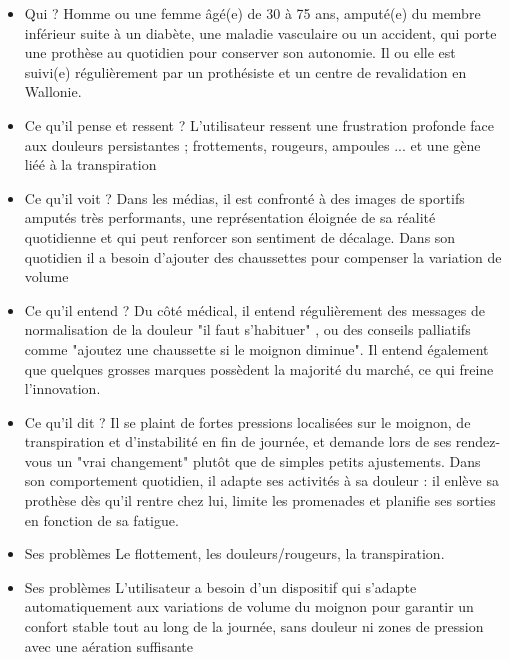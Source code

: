 \begin{itemize}
    \item Qui ? Homme ou une femme âgé(e) de 30 à 75 ans, amputé(e) du membre inférieur suite à un diabète, une maladie vasculaire ou un accident, qui porte une prothèse au quotidien pour conserver son autonomie. Il ou elle est suivi(e) régulièrement par un prothésiste et un centre de revalidation en Wallonie.

    \item Ce qu'il pense et ressent ? L'utilisateur ressent une frustration profonde face aux douleurs persistantes ; frottements, rougeurs, ampoules ... et une gène liéé à la transpiration 

    \item Ce qu'il voit ?  Dans les médias, il est confronté à des images de sportifs amputés très performants, une représentation éloignée de sa réalité quotidienne et qui peut renforcer son sentiment de décalage. Dans son quotidien il a besoin d'ajouter des chaussettes pour compenser la variation de volume

    \item Ce qu'il entend ? Du côté médical, il entend régulièrement des messages de normalisation de la douleur "il faut s'habituer" , ou des conseils palliatifs comme "ajoutez une chaussette si le moignon diminue". Il entend également que quelques grosses marques possèdent la majorité du marché, ce qui freine l'innovation.

    \item Ce qu'il dit ?
    Il se plaint de fortes pressions localisées sur le moignon, de transpiration et d'instabilité en fin de journée, et demande lors de ses rendez-vous un "vrai changement" plutôt que de simples petits ajustements. Dans son comportement quotidien, il adapte ses activités à sa douleur : il enlève sa prothèse dès qu'il rentre chez lui, limite les promenades et planifie ses sorties en fonction de sa fatigue.

    \item Ses problèmes Le flottement, les douleurs/rougeurs, la transpiration.

    \item Ses problèmes
    L'utilisateur a besoin d'un dispositif qui s'adapte automatiquement aux variations de volume du moignon pour garantir un confort stable tout au long de la journée, sans douleur ni zones de pression avec une aération suffisante
  
\end{itemize}


